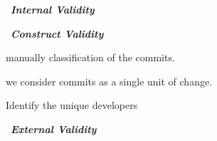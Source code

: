 \noindent~\textbf{\textit{Internal Validity}}

\noindent~\textbf{\textit{Construct Validity}}

manually classification of the commits. 

we consider commits as a single unit of change.

Identify the unique developers 


\noindent~\textbf{\textit{External Validity}}